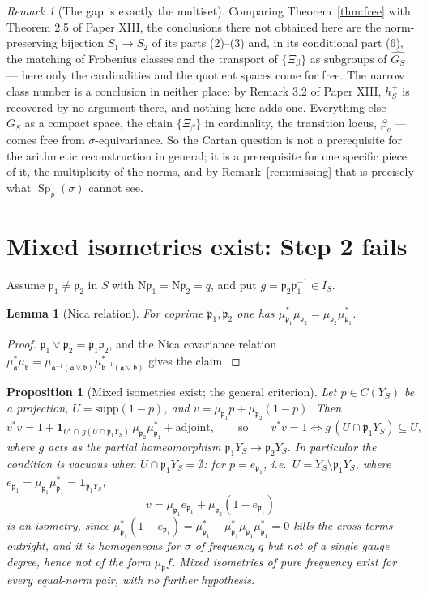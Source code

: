 \documentclass[11pt]{amsart}
\numberwithin{equation}{section}
\newtheorem{proposition}[theorem]{Proposition}
\newtheorem{lemma}[theorem]{Lemma}
\theoremstyle{definition}
\theoremstyle{remark}
\newtheorem{remark}[theorem]{Remark}
\newcommand{\pp}{\mathfrak{p}}
\newcommand{\aaa}{\mathfrak{a}}
\newcommand{\bb}{\mathfrak{b}}
\newcommand{\Ns}{\mathrm{N}}
\newcommand{\Sp}{\operatorname{Sp}}
\begin{document}
\begin{remark}[The gap is exactly the multiset]\label{rem:onlygap}
Comparing Theorem~\ref{thm:free} with Theorem 2.5 of Paper XIII, the conclusions there not
obtained here are the norm-preserving bijection $S_1\to S_2$ of its parts (2)--(3) and, in
its conditional part (6), the matching of Frobenius classes and the transport of
$\{\Xi_\beta\}$ as subgroups of $\widehat{G_S}$ --- here only the cardinalities and the
quotient spaces come for free. The narrow class number is a conclusion in neither place: by
Remark 3.2 of Paper XIII, $h^+_S$ is recovered by no argument there, and nothing here adds
one. Everything else --- $G_S$ as a compact space, the chain $\{\Xi_\beta\}$ in cardinality,
the transition locus, $\beta_c$ --- comes free from $\sigma$-equivariance. So the Cartan
question is not a prerequisite for the arithmetic reconstruction in general; it is a
prerequisite for one specific piece of it, the multiplicity of the norms, and by
Remark~\ref{rem:missing} that is precisely what $\Sp_p(\sigma)$ cannot see.
\end{remark}

\section{Mixed isometries exist: Step 2 fails}

Assume $\pp_1\ne\pp_2$ in $S$ with $\Ns\pp_1=\Ns\pp_2=q$, and put $g=\pp_2\pp_1^{-1}\in I_S$.

\begin{lemma}[Nica relation]\label{lem:nica}
For coprime $\pp_1,\pp_2$ one has $\mu_{\pp_1}^*\mu_{\pp_2}=\mu_{\pp_2}\mu_{\pp_1}^*$.
\end{lemma}

\begin{proof}
$\pp_1\vee\pp_2=\pp_1\pp_2$, and the Nica covariance relation \cite{Nica}
$\mu_\aaa^*\mu_\bb=\mu_{\aaa^{-1}(\aaa\vee\bb)}\mu_{\bb^{-1}(\aaa\vee\bb)}^*$ gives the claim.
\end{proof}

\begin{proposition}[Mixed isometries exist; the general criterion]\label{prop:mixed}
Let $p\in C(Y_S)$ be a projection, $U=\mathrm{supp}(1-p)$, and
$v=\mu_{\pp_1}p+\mu_{\pp_2}(1-p)$. Then
\[
v^*v=1+\mathbf 1_{U^c\cap\,g(U\cap\pp_1Y_S)}\,\mu_{\pp_2}\mu_{\pp_1}^*+\text{adjoint},
\qquad\text{so}\qquad
v^*v=1\iff g\,(U\cap\pp_1Y_S)\subseteq U,
\]
where $g$ acts as the partial homeomorphism $\pp_1Y_S\to\pp_2Y_S$. In particular the
condition is vacuous when $U\cap\pp_1Y_S=\emptyset$: for $p=e_{\pp_1}$, i.e.\
$U=Y_S\setminus\pp_1Y_S$, where $e_{\pp_1}=\mu_{\pp_1}\mu_{\pp_1}^*=\mathbf 1_{\pp_1Y_S}$,
\[
v=\mu_{\pp_1}e_{\pp_1}+\mu_{\pp_2}(1-e_{\pp_1})
\]
is an isometry, since $\mu_{\pp_1}^*(1-e_{\pp_1})=\mu_{\pp_1}^*-\mu_{\pp_1}^*\mu_{\pp_1}\mu_{\pp_1}^*=0$
kills the cross terms outright, and it is homogeneous for $\sigma$ of frequency $q$ but not
of a single gauge degree, hence not of the form $\mu_\pp f$. \emph{Mixed isometries of pure
frequency exist for every equal-norm pair, with no further hypothesis.}
\end{proposition}
\end{document}
